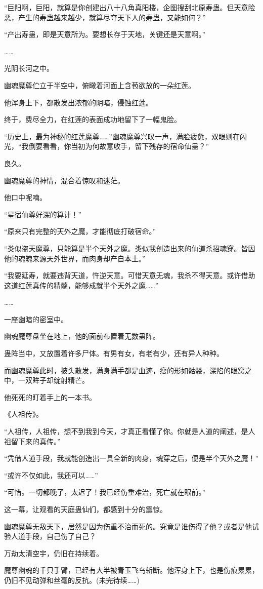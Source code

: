 \begin{this_body}
“巨阳啊，巨阳，就算是你创建出八十八角真阳楼，企图搜刮北原寿蛊。但天意险恶，产生的寿蛊越来越少，就算尽夺天下人的寿蛊，又能如何？”

“产出寿蛊，即是天意所为。要想长存于天地，关键还是天意啊。”

……

光阴长河之中。

幽魂魔尊伫立于半空中，俯瞰着河面上含苞欲放的一朵红莲。

他浑身上下，都散发出浓郁的阴暗，侵蚀红莲。

终于，费尽全力，在红莲的表面成功地留下了一幅鬼脸。

“历史上，最为神秘的红莲魔尊……”幽魂魔尊兴叹一声，满脸疲惫，双眼则在闪光，“我倒要看看，你当初为何故意收手，留下残存的宿命仙蛊？”

良久。

幽魂魔尊的神情，混合着惊叹和迷茫。

他口中呢喃。

“星宿仙尊好深的算计！”

“原来只有完整的天外之魔，才能彻底打破宿命。”

“类似盗天魔尊，只能算是半个天外之魔。类似我创造出来的仙道杀招魂穿。皆因他的魂魄来源天外世界，而肉身却产自本土。”

“我要延寿，就要违背天道，忤逆天意。可惜天意无魂，我杀不得天意。或许借助这道红莲真传的精髓，能够成就半个天外之魔……”

……

一座幽暗的密室中。

幽魂魔尊盘坐在地上，他的面前布置着无数蛊阵。

蛊阵当中，又放置着许多尸体。有男有女，有老有少，还有异人种种。

而幽魂魔尊此时，披头散发，满身满手都是血迹，瘦的形如骷髅，深陷的眼窝之中，一双眸子却绽射精芒。

他死死的盯着手上的一本书。

《人祖传》。

“人祖传，人祖传，想不到我到今天，才真正看懂了你。你就是人道的阐述，是人祖留下来的真传。”

“凭借人道手段，我就能创造出一具全新的肉身，魂穿之后，便是半个天外之魔！”

“或许不仅如此，我还可以……”

“可惜。一切都晚了，太迟了！我已经伤重难治，死亡就在眼前。”

这一幕，让观看的天庭蛊仙们，都感到十分的震惊。

幽魂魔尊无敌天下，居然是因为伤重不治而死的。究竟是谁伤得了他？或者是他试验人道手段，自己伤了自己？

万劫太清空宇，仍旧在持续着。

魔尊幽魂的千只手臂，已经有大半被青玉飞鸟斩断。他浑身上下，也是伤痕累累，仍旧不见动弹和丝毫的反抗。(未完待续……)

\end{this_body}

